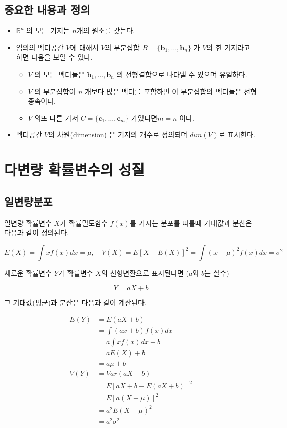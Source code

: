 \documentclass[
  11pt,
  a4paper,
  oneside]{scrbook}
\providecommand{\tightlist}{%
  \setlength{\itemsep}{0pt}\setlength{\parskip}{0pt}}\usepackage{longtable,booktabs,array}
\newcommand{\RR}{\mathbb{R}}
\theoremstyle{definition}
\theoremstyle{plain}
\theoremstyle{definition}
\theoremstyle{definition}
\theoremstyle{remark}
\begin{document}
\section{중요한 내용과
정의}\label{uxc911uxc694uxd55c-uxb0b4uxc6a9uxacfc-uxc815uxc758}

\begin{itemize}
\tightlist
\item
  \(\RR^n\) 의 모든 기저는 \(n\)개의 원소를 갖는다.
\item
  임의의 벡터공간 \(V\)에 대해서 \(V\)의 부분집합
  \(B = \{\pmb b_1,\dots,\pmb b_n\}\) 가 \(V\)의 한 기저라고 하면 다음을
  보일 수 있다.

  \begin{itemize}
  \tightlist
  \item
    \(V\) 의 모든 벡터들은 \(\pmb b_1,\dots,\pmb b_n\) 의 선형결합으로
    나타낼 수 있으며 유일하다.
  \item
    \(V\) 의 부분집합이 \(n\) 개보다 많은 벡터를 포함하면 이 부분집합의
    벡터들은 선형종속이다.
  \item
    \(V\) 의또 다른 기저 \(C=\{\pmb c_1,\dots,\pmb c_m \}\)
    가있다면\(m=n\) 이다.
  \end{itemize}
\item
  벡터공간 \(V\)의 차원(dimension) 은 기저의 개수로 정의되며
  \(dim(V)\)로 표시한다.
\end{itemize}

\chapter{다변량 확률변수의 성질}\label{sec-mulivar}

\section{일변량분포}\label{uxc77cuxbcc0uxb7c9uxbd84uxd3ec}

일변량 확률변수 \(X\)가 확률밀도함수 \(f(x)\)를 가지는 분포를 따를때
기대값과 분산은 다음과 같이 정의된다.

\[ E(X) = \int x f(x)  dx = \mu, \quad V(X) = E[ X-E(X)]^2=\int (x-\mu)^2 f(x) dx =\sigma^2 \]

새로운 확률변수 \(Y\)가 확률변수 \(X\)의 선형변환으로 표시된다면
(\(a\)와 \(b\)는 실수)

\[ Y = aX+b\]

그 기대값(평균)과 분산은 다음과 같이 계산된다.

\[
\begin{align}
E(Y) &= E(aX+b) \\
&= \int (ax+b) f(x) dx \\
&= a \int x f(x) dx + b \\
&= a E(X) + b\\
&= a \mu + b \\
V(Y) &= Var(aX+b) \\
&= E[aX+b -E(aX+b)]^2 \\
&= E[a(X-\mu)]^2 \\
&= a^2 E(X-\mu)^2\\
&= a^2 \sigma^2
\end{align}
\]
\end{document}
